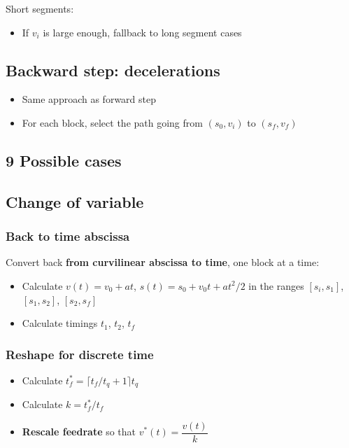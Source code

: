 \documentclass[
  letterpaper,
  DIV=11,
  numbers=noendperiod]{scrartcl}
\providecommand{\tightlist}{%
  \setlength{\itemsep}{0pt}\setlength{\parskip}{0pt}}
\begin{document}
Short segments:

\begin{itemize}
\tightlist
\item
  If \(v_i\) is large enough, fallback to long segment cases
\end{itemize}

\subsection{Backward step:
decelerations}\label{backward-step-decelerations}

\begin{itemize}
\tightlist
\item
  Same approach as forward step
\item
  For each block, select the path going from \((s_0, v_i)\) to
  \((s_f, v_f)\)
\end{itemize}

\subsection{9 Possible cases}\label{possible-cases}

\subsection{Change of variable}\label{change-of-variable}

\subsubsection{Back to time abscissa}\label{back-to-time-abscissa}

Convert back \textbf{from curvilinear abscissa to time}, one block at a
time:

\begin{itemize}
\tightlist
\item
  Calculate \(v(t) = v_0 + at\), \(s(t) = s_0 + v_0 t + at^2/2\) in the
  ranges \([s_i, s_1]\), \([s_1, s_2]\), \([s_2, s_f]\)
\item
  Calculate timings \(t_1\), \(t_2\), \(t_f\)
\end{itemize}

\subsubsection{Reshape for discrete
time}\label{reshape-for-discrete-time}

\begin{itemize}
\tightlist
\item
  Calculate \(t_f^* = \lceil t_f / t_q + 1 \rceil t_q\)
\item
  Calculate \(k = t_f^* / t_f\)
\item
  \textbf{Rescale feedrate} so that \(v^*(t) = \dfrac{v(t)}{k}\)
\end{itemize}
\end{document}
